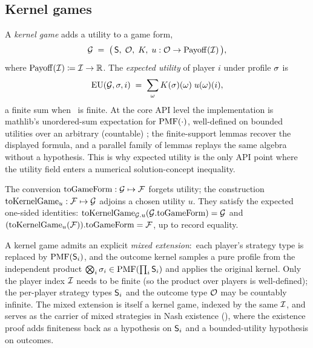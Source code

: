 

\subsection{Kernel games}
\label{sec:semantic-core:kernelgame}

A \emph{kernel game} adds a utility to a game form,
\begin{equation}
\label{eq:kernelgame}
  \mathcal{G} \;=\; \bigl(\,\mathsf{S},\;\mathcal{O},\;K,\;u : \mathcal{O} \to \mathrm{Payoff}(\mathcal{I})\,\bigr),
\end{equation}
where $\mathrm{Payoff}(\mathcal{I}) \coloneqq \mathcal{I} \to \mathbb{R}$.  The
\emph{expected utility} of player $i$ under profile $\sigma$ is
\begin{equation}
\label{eq:eu}
  \mathrm{EU}(\mathcal{G}, \sigma, i) \;=\; \sum_{\omega} K(\sigma)(\omega)\;u(\omega)(i),
\end{equation}
a finite sum when \Outcome\ is finite.  At the core API level the
implementation is mathlib's unordered-sum expectation for
$\mathrm{PMF}(\cdot)$, well-defined on bounded utilities over an arbitrary
(countable) \Outcome; the finite-support lemmas recover the
displayed formula, and a parallel family of
 lemmas replays the same algebra without a
 hypothesis.  This is why expected utility is
the only API point where the utility field enters a numerical
solution-concept inequality.

The conversion $\mathrm{toGameForm} : \mathcal{G} \mapsto \mathcal{F}$ forgets utility; the
construction $\mathrm{toKernelGame}_u : \mathcal{F} \mapsto \mathcal{G}$ adjoins a chosen utility
$u$.  They satisfy the expected one-sided identities:
$\mathrm{toKernelGame}_{\mathcal{G}.u}(\mathcal{G}.\mathrm{toGameForm}) = \mathcal{G}$ and
$(\mathrm{toKernelGame}_u(\mathcal{F})).\mathrm{toGameForm} = \mathcal{F}$, up to record equality.

A kernel game admits an explicit \emph{mixed extension}:\ each
player's strategy type is replaced by $\mathrm{PMF}(\mathsf{S}_i)$, and the
outcome kernel samples a pure profile from the independent product
$\bigotimes_i \sigma_i \in \mathrm{PMF}(\prod_i \mathsf{S}_i)$ and applies
the original kernel.  Only the player index $\mathcal{I}$ needs to
be finite (so the product over players is well-defined); the
per-player strategy types $\mathsf{S}_i$ and the outcome type
$\mathcal{O}$ may be countably infinite.  The mixed extension is
itself a kernel game, indexed by the same $\mathcal{I}$, and serves
as the carrier of mixed strategies in Nash existence
(), where the existence proof
adds finiteness back as a hypothesis on $\mathsf{S}_i$ and a
bounded-utility hypothesis on outcomes.

